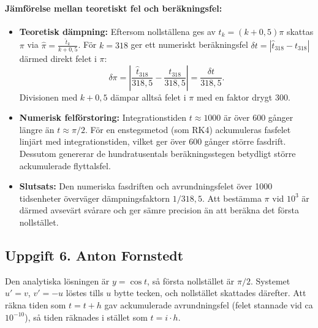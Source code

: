 \documentclass{article}
\begin{document}
\paragraph{Jämförelse mellan teoretiskt fel och beräkningsfel:}
\begin{itemize}
    \item \textbf{Teoretisk dämpning:}
    Eftersom nollställena ges av $t_k = (k + 0{,}5)\pi$ skattas $\pi$ via $\hat{\pi} = \frac{\hat{t}_k}{k + 0{,}5}$. För $k = 318$ ger ett numeriskt beräkningsfel $\delta t = |\hat{t}_{318} - t_{318}|$ därmed direkt felet i $\pi$:
    \begin{equation}
        \delta \pi = \left| \frac{\hat{t}_{318}}{318{,}5} - \frac{t_{318}}{318{,}5} \right| = \frac{\delta t}{318{,}5}.
    \end{equation}
    Divisionen med $k + 0{,}5$ dämpar alltså felet i $\pi$ med en faktor drygt $300$.
    \item \textbf{Numerisk felförstoring:} Integrationstiden $t \approx 1000$ är över $600$ gånger längre än $t \approx \pi/2$. För en enstegsmetod (som RK4) ackumuleras fasfelet linjärt med integrationstiden, vilket ger över $600$ gånger större fasdrift. Dessutom genererar de hundratusentals beräkningsstegen betydligt större ackumulerade flyttalsfel.
    \item \textbf{Slutsats:} Den numeriska fasdriften och avrundningsfelet över 1000 tidsenheter överväger dämpningsfaktorn $1/318{,}5$. Att bestämma $\pi$ vid $10^3$ är därmed avsevärt svårare och ger sämre precision än att beräkna det första nollstället.
\end{itemize}

\subsection*{Uppgift 6. Anton Fornstedt}

Den analytiska lösningen är $y = \cos t$, så första nollstället är $\pi/2$.
Systemet $u' = v$, $v' = -u$ löstes tills $u$ bytte tecken, och nollstället
skattades därefter. Att räkna tiden som $t = t + h$ gav ackumulerade
avrundningsfel (felet stannade vid ca $10^{-10}$), så tiden räknades i stället
som $t = i \cdot h$.
\end{document}
